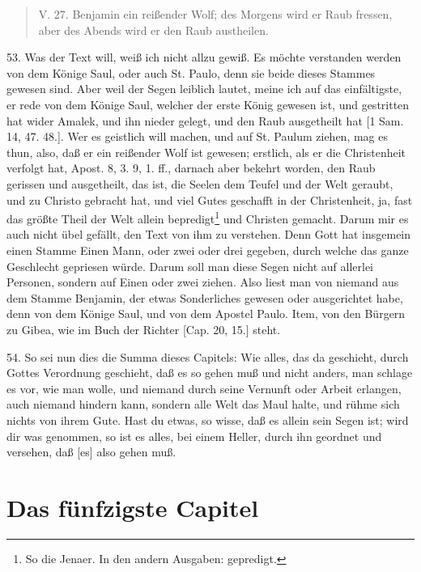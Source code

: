 \begin{quote}
V. 27. Benjamin ein reißender Wolf; des Morgens wird er Raub fressen, aber des Abends wird er den Raub austheilen.
\end{quote}

53. Was der Text will, weiß ich nicht allzu gewiß. Es möchte verstanden werden von dem Könige Saul, oder auch St. Paulo, denn sie beide dieses Stammes gewesen sind. Aber weil der Segen leiblich lautet, meine ich auf das einfältigste, er rede von dem Könige Saul, welcher der erste König gewesen ist, und gestritten hat wider Amalek, und ihn nieder gelegt, und den Raub ausgetheilt hat [1 Sam. 14, 47. 48.]. Wer es geistlich will machen, und auf St. Paulum ziehen, mag es thun, also, daß er ein reißender Wolf ist gewesen; erstlich, als er die Christenheit verfolgt hat, Apost. 8, 3. 9, 1. ff., darnach aber bekehrt worden, den Raub gerissen und ausgetheilt, das ist, die Seelen dem Teufel und der Welt geraubt, und zu Christo gebracht hat, und viel Gutes geschafft in der Christenheit, ja, fast das größte Theil der Welt allein bepredigt\footnote{So die Jenaer. In den andern Ausgaben: gepredigt.} und Christen gemacht. Darum mir es auch nicht übel gefällt, den Text von ihm zu verstehen. Denn Gott hat insgemein einen Stamme Einen Mann, oder zwei oder drei gegeben, durch welche das ganze Geschlecht gepriesen würde. Darum soll man diese Segen nicht auf allerlei Personen, sondern auf Einen oder zwei ziehen. Also liest man von niemand aus dem Stamme Benjamin, der etwas Sonderliches gewesen oder ausgerichtet habe, denn von dem Könige Saul, und von dem Apostel Paulo. Item, von den Bürgern zu Gibea, wie im Buch der Richter [Cap. 20, 15.] steht.

54. So sei nun dies die Summa dieses Capitels: Wie alles, das da geschieht, durch Gottes Verordnung geschieht, daß es so gehen muß und nicht anders, man schlage es vor, wie man wolle, und niemand durch seine Vernunft oder Arbeit erlangen, auch niemand hindern kann, sondern alle Welt das Maul halte, und rühme sich nichts von ihrem Gute. Hast du etwas, so wisse, daß es allein sein Segen ist; wird dir was genommen, so ist es alles, bei einem Heller, durch ihn geordnet und versehen, daß [es] also gehen muß.

\section{Das fünfzigste Capitel}

